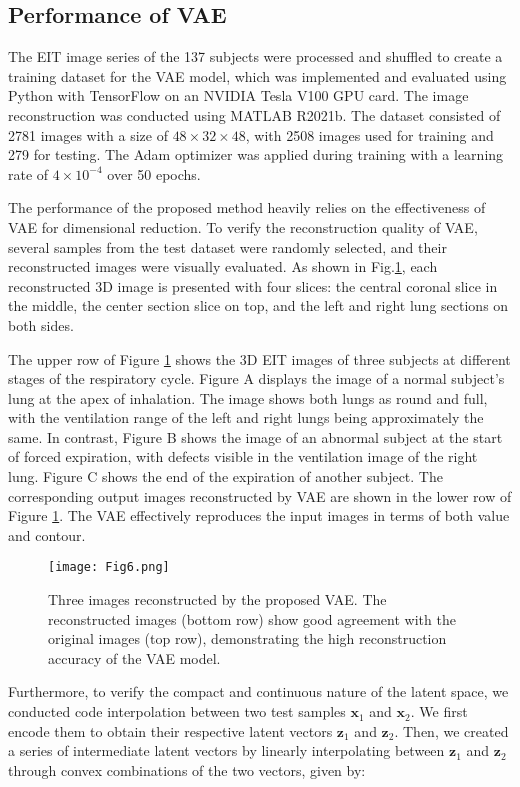 \documentclass[journal,twoside,web]{ieeecolor}
\begin{document}
\subsection{Performance of VAE}
The EIT image series of the 137 subjects were processed and shuffled to create a training dataset for the VAE model, which was implemented and evaluated using Python with TensorFlow on an NVIDIA Tesla V100 GPU card. The image reconstruction was conducted using MATLAB R2021b. The dataset consisted of 2781 images with a size of $48 \times 32\times 48$, with 2508 images used for training and 279 for testing. The Adam optimizer was applied during training with a learning rate of $4 \times 10^{-4}$ over 50 epochs.

The performance of the proposed method heavily relies on the effectiveness of VAE for dimensional reduction. To verify the reconstruction quality of VAE, several samples from the test dataset were randomly selected, and their reconstructed images were visually evaluated. As shown in Fig.\ref{recon}, each reconstructed 3D image is presented with four slices: the central coronal slice in the middle, the center section slice on top, and the left and right lung sections on both sides.

The upper row of Figure \ref{recon} shows the 3D EIT images of three subjects at different stages of the respiratory cycle. Figure A displays the image of a normal subject's lung at the apex of inhalation. The image shows both lungs as round and full, with the ventilation range of the left and right lungs being approximately the same. In contrast, Figure B shows the image of an abnormal subject at the start of forced expiration, with defects visible in the ventilation image of the right lung. Figure C shows the end of the expiration of another subject. The corresponding output images reconstructed by VAE are shown in the lower row of Figure \ref{recon}. The VAE effectively reproduces the input images in terms of both value and contour. 

\begin{figure}[!htbp] 
	\centering
	\texttt{[image: Fig6.png]}
	\caption{Three images reconstructed by the proposed VAE. The reconstructed images (bottom row) show good agreement with the original images (top row), demonstrating the high reconstruction accuracy of the VAE model.}
	\label{recon}
\end{figure}

Furthermore, to verify the compact and continuous nature of the latent space, we conducted code interpolation between two test samples $\bm x_1$ and $\bm x_2$. We first encode them to obtain their respective latent vectors $\bm z_1$ and $\bm z_2$. Then, we created a series of intermediate latent vectors by linearly interpolating between $\bm z_1$ and $\bm z_2$ through convex combinations of the two vectors, given by:
\end{document}
